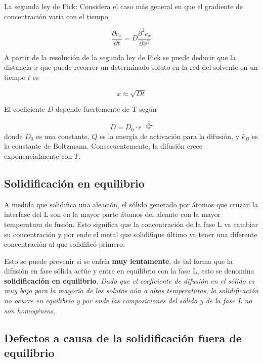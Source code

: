 La segunda ley de Fick: Considera el caso más general en que el gradiente de concentración varía con el tiempo

\begin{equation}
	\frac{\partial c_x}{\partial t} = D \frac{\partial^2 c_x}{\partial x ^2}
\end{equation}

A partir de la resolución de la segunda ley de Fick se puede deducir que la distancia $x$ que puede recorrer un determinado soluto en la red del solvente en un tiempo $t$ es 

\begin{equation}
	x \approx \sqrt{Dt}
\end{equation}

El coeficiente $D$ depende fuertemente de T según

\begin{equation}
	D = D_0 \cdot e^{-\frac{Q}{k_B T}}
\end{equation}
donde $D_0$ es una constante, $Q$ es la energía de activación para la difusión, y $k_B$ es la constante de Boltzmann. Consecuentemente, la difusión crece exponencialmente con $T$.

\subsection{Solidificación en equilibrio}

A medida que solidifica una aleación, el sólido generado por átomos que cruzan la interfase del L son en la mayor parte átomos del aleante con la mayor temperatura de fusión. Esto significa que la concentración de la fase L va cambiar su concentración y por ende el metal que solidifique último va tener una diferente concentración al que solidificó primero. 

Esto se puede prevenir si se enfría \textbf{muy lentamente}, de tal forma que la difusión en fase sólida actúe y entre en equilibrio con la fase L, esto se denomina \textbf{solidificación en equilibrio}. \textit{Dado que el coeficiente de difusión en el sólido  es muy bajo para la mayoría de los solutos aún a altas temperaturas, la solidificación no ocurre en equilibrio y por ende las composiciones del sólido y de la fase L no son homogéneas.}

\subsection{Defectos a causa de la solidificación fuera de equilibrio}

